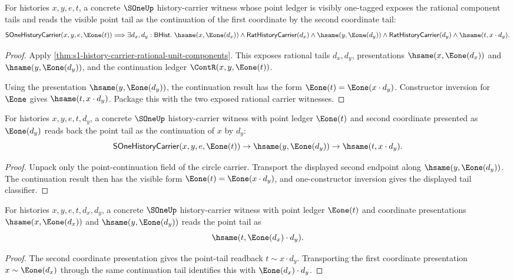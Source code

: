 \begin{theorem}
\label{thm:sone-history-carrier-point-tail-readback}
For histories $x,y,e,t$, a concrete $\SOneUp$ history-carrier witness whose
point ledger is visibly one-tagged exposes the rational component tails and
reads the visible point tail as the continuation of the first coordinate by
the second coordinate tail:
$$
\mathsf{SOneHistoryCarrier}(x,y,e,\Eone(t))
\Longrightarrow
\exists d_x,d_y:\mathsf{BHist}.\;
\hsame(x,\Eone(d_x))\land \mathsf{RatHistoryCarrier}(d_x)\land
\hsame(y,\Eone(d_y))\land \mathsf{RatHistoryCarrier}(d_y)\land
\hsame(t,x\cdot d_y).
$$
\end{theorem}
\begin{proof}
Apply
\autoref{thm:s1-history-carrier-rational-unit-components}. This exposes
rational tails $d_x,d_y$, presentations $\hsame(x,\Eone(d_x))$ and
$\hsame(y,\Eone(d_y))$, and the continuation ledger
$\ContR(x,y,\Eone(t))$.

Using the presentation $\hsame(y,\Eone(d_y))$, the continuation result has the
form $\Eone(t)=\Eone(x\cdot d_y)$. Constructor inversion for $\Eone$ gives
$\hsame(t,x\cdot d_y)$. Package this with the two exposed rational carrier
witnesses.
\end{proof}

\begin{theorem}
\label{thm:sone-history-carrier-y-e1-point-tail-hsame}
For histories $x,y,e,t,d_y$, a concrete $\SOneUp$ history-carrier witness with
point ledger $\Eone(t)$ and second coordinate presented as $\Eone(d_y)$ reads
back the point tail as the continuation of $x$ by $d_y$:
$$
\mathsf{SOneHistoryCarrier}(x,y,e,\Eone(t))\to
\hsame(y,\Eone(d_y))\to
\hsame(t,x\cdot d_y).
$$
\end{theorem}
\begin{proof}
Unpack only the point-continuation field of the circle carrier. Transport the
displayed second endpoint along $\hsame(y,\Eone(d_y))$. The continuation result
then has the visible form $\Eone(t)=\Eone(x\cdot d_y)$, and one-constructor
inversion gives the displayed tail classifier.
\end{proof}

\begin{theorem}
\label{thm:sone-x-y-e1-point-tail-hsame}
For histories $x,y,e,t,d_x,d_y$, a concrete $\SOneUp$ history-carrier witness
with point ledger $\Eone(t)$ and coordinate presentations
$\hsame(x,\Eone(d_x))$ and $\hsame(y,\Eone(d_y))$ reads the point tail as
$$
\hsame(t,\Eone(d_x)\cdot d_y).
$$
\end{theorem}
\begin{proof}
The second coordinate presentation gives the point-tail readback
$t\sim x\cdot d_y$. Transporting the first coordinate presentation
$x\sim \Eone(d_x)$ through the same continuation tail identifies this with
$\Eone(d_x)\cdot d_y$.
\end{proof}

